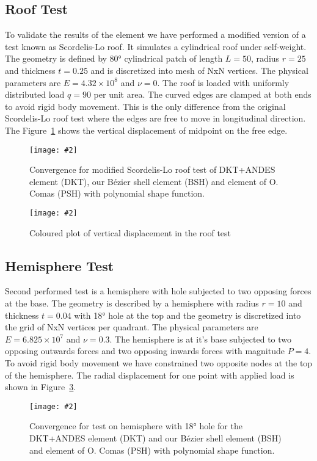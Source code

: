 \documentclass{egpubl}
\newcommand{\Figure}[3]{%
\begin{figure}[htb]
  \centering
  \texttt{[image: \#2]}
  \caption{\label{fig-#2}#3}
\end{figure}}
\begin{document}
\subsection{Roof Test}\label{sec-roof}

To validate the results of the element we have performed a modified version
of a test known as Scordelis-Lo roof. It simulates a cylindrical roof under
self-weight. The geometry is defined by 80° cylindrical patch of length
$L=50$, radius $r=25$ and thickness $t=0.25$ and is discretized into
mesh of NxN vertices. The physical parameters are $E = 4.32 \times 10^8$ and
$\nu = 0$. The roof is loaded with uniformly distributed load $q = 90$ per
unit area. The curved edges are clamped at both ends to avoid rigid body
movement. This is the only difference from the original Scordelis-Lo roof test
where the edges are free to move in longitudinal direction. The
Figure~\ref{fig-roof} shows the vertical displacement of midpoint on the free
edge.

\Figure{\linewidth}{roof}
{Convergence for modified Scordelis-Lo roof test of DKT+ANDES element (DKT), 
our B\'ezier shell element (BSH) and element of O. Comas (PSH) with polynomial shape function.}

\Figure{\linewidth}{roof-img}
{Coloured plot of vertical displacement in the roof test}


\subsection{Hemisphere Test}\label{sec-hemisphere}

Second performed test is a hemisphere with hole subjected to two opposing
forces at the base. The geometry is described by a hemisphere with radius
$r=10$ and thickness $t=0.04$ with 18° hole at the top and the geometry is
discretized into the grid of NxN vertices per quadrant. The physical
parameters are $E = 6.825 \times 10^7$ and $\nu = 0.3$. The hemisphere is
at it's base subjected to two opposing outwards forces and two opposing
inwards forces with magnitude $P = 4$. To avoid rigid body movement we have
constrained two opposite nodes at the top of the hemisphere. The radial
displacement for one point with applied load is shown in Figure~\ref{fig-hemisphere}.

\Figure{\linewidth}{hemisphere}
{Convergence for test on hemisphere with 18° hole for the DKT+ANDES element (DKT) and
our B\'ezier shell element (BSH) and element of O. Comas (PSH) with polynomial shape function.}
\end{document}
